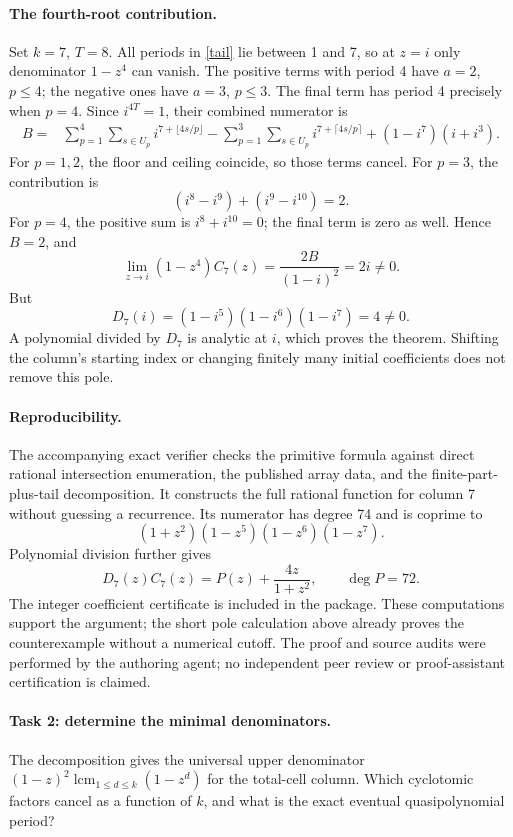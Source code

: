 \documentclass[11pt]{article}
\begin{document}
\paragraph{The fourth-root contribution.}
Set \(k=7\), \(T=8\). All periods in \eqref{tail} lie between 1 and 7,
so at \(z=i\) only denominator \(1-z^4\) can vanish.
The positive terms with period 4 have \(a=2\), \(p\le4\); the negative
ones have \(a=3\), \(p\le3\). The final term has period 4 precisely
when \(p=4\). Since \(i^{4T}=1\), their combined numerator is
\begin{equation}\label{B}
\begin{split}
 B={}&\sum_{p=1}^4\sum_{s\in U_p}
 i^{7+\lfloor4s/p\rfloor}
 -\sum_{p=1}^3\sum_{s\in U_p}
 i^{7+\lceil4s/p\rceil}
 +(1-i^7)(i+i^3).
\end{split}
\end{equation}
For \(p=1,2\), the floor and ceiling coincide, so those terms cancel.
For \(p=3\), the contribution is
\[
 (i^8-i^9)+(i^9-i^{10})=2.
\]
For \(p=4\), the positive sum is \(i^8+i^{10}=0\);
the final term is zero as well. Hence \(B=2\), and
\[
 \lim_{z\to i}(1-z^4)C_7(z)
 =\frac{2B}{(1-i)^2}=2i\ne0.
\]
But
\[
 D_7(i)=(1-i^5)(1-i^6)(1-i^7)=4\ne0.
\]
A polynomial divided by \(D_7\) is analytic at \(i\), which proves the
theorem. Shifting the column's starting index or changing finitely
many initial coefficients does not remove this pole.

\paragraph{Reproducibility.}
The accompanying exact verifier checks the primitive formula against
direct rational intersection enumeration, the published array data,
and the finite-part-plus-tail decomposition. It constructs the full
rational function for column 7 without guessing a recurrence.
Its numerator has degree 74 and is coprime to
\[
 (1+z^2)(1-z^5)(1-z^6)(1-z^7).
\]
Polynomial division further gives
\[
 D_7(z)C_7(z)=P(z)+\frac{4z}{1+z^2},
 \qquad \deg P=72.
\]
The integer coefficient certificate is included in the package.
These computations support the argument; the short pole calculation
above already proves the counterexample without a numerical cutoff.
The proof and source audits were performed by the authoring agent;
no independent peer review or proof-assistant certification is claimed.

\paragraph{Task 2: determine the minimal denominators.}
The decomposition gives the universal upper denominator
\((1-z)^2\operatorname{lcm}_{1\le d\le k}(1-z^d)\)
for the total-cell column. Which cyclotomic factors cancel as a function
of \(k\), and what is the exact eventual quasipolynomial period?
\end{document}
